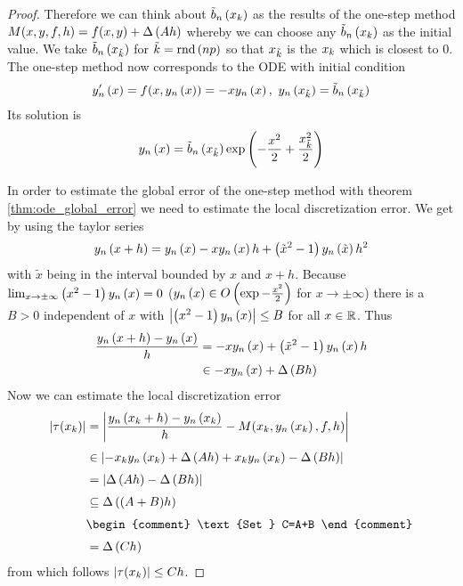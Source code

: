 \begin{proof}
  Therefore we can think about $\tilde b_{n}\left({x_{k}}\right)$ as the results of the one-step method $M(x,y,f,h)=f(x,y)+\Delta\left( {Ah} \right)$ whereby we can choose any $\tilde b_{n}\left({x_{k}}\right)$ as the initial value. We take $\tilde b_{n}\left({x_{\tilde k}}\right)$ for $\tilde k=\operatorname{rnd}\left( {np} \right)$ so that $x_{\tilde k}$ is the $x_{k}$ which is closest to $0$. The one-step method now corresponds to the ODE with initial condition
  \begin{align}
    y_{n}'\left({x}\right)=f(x,y_{n}\left({x}\right))=-xy_{n}\left({x}\right),\ y_{n}\left({x_{\tilde k}}\right) = \tilde b_{n}\left({x_{\tilde k}}\right)
  \end{align}
  Its solution is
  \begin{align}
    y_{n}\left({x}\right) = \tilde b_{n}\left({x_{\tilde k}}\right)\exp\left( {-\frac{x^2}2+\frac{x_{\tilde k}^2}2} \right)
  \end{align}

  In order to estimate the global error of the one-step method with theorem \ref{thm:ode_global_error} we need to estimate the local discretization error. We get by using the taylor series
  \begin{align}
    y_{n}\left({x+h}\right) = y_{n}\left({x}\right) -xy_{n}\left({x}\right)h+\left( {\tilde x^2-1} \right)y_{n}\left({\tilde x}\right) h^2
  \end{align}
  with $\tilde x$ being in the interval bounded by $x$ and $x+h$. Because $\lim_{x\to\pm\infty} \left( {x^2-1} \right)y_{n}\left({x}\right)=0$ ($y_{n}\left({x}\right) \in O\left( {\exp{-\frac{x^2}2}} \right)$ for $x\to\pm\infty$) there is a $B > 0$ independent of $x$ with $\left|{\left( {x^2-1} \right)y_{n}\left({x}\right)}\right| \le B$ for all $x\in\mathbb R$. Thus
  \begin{align}
    \frac{y_{n}\left({x+h}\right)-y_{n}\left({x}\right)}h &= -xy_{n}\left({x}\right)+\left( {\tilde x^2-1} \right)y_{n}\left({x}\right) h \\
    &\in -xy_{n}\left({x}\right) + \Delta\left( {Bh} \right)
  \end{align}
  Now we can estimate the local discretization error
  \begin{align}
    \abs{\tau(\x)} &= \abs{\frac{\phin{\x[k]+h}-\phin{\x}}h -  M(\x,\phin{\x},f,h)} \nl
    &\in \abs{-\x\phin{\x} + \bigabs{Ah} +\x\phin{\x} - \bigabs{Bh}} \nl
    &= \abs{\bigabs{Ah}-\bigabs{Bh}} \nl
    &\subseteq \bigabs{(A+B)h} \nl
    &
    \begin{comment}
      \text{Set } C=A+B
    \end{comment} \nl
    &= \bigabs{Ch}
  \end{align}
  from which follows $\left|{\tau(x_{k})}\right| \le Ch$.


\end{proof}
